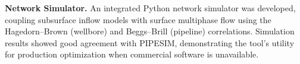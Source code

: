 \textbf{Network Simulator.} An integrated Python network simulator was developed, coupling subsurface inflow models with surface multiphase flow using the Hagedorn--Brown (wellbore) and Beggs--Brill (pipeline) correlations. Simulation results showed good agreement with PIPESIM, demonstrating the tool's utility for production optimization when commercial software is unavailable.